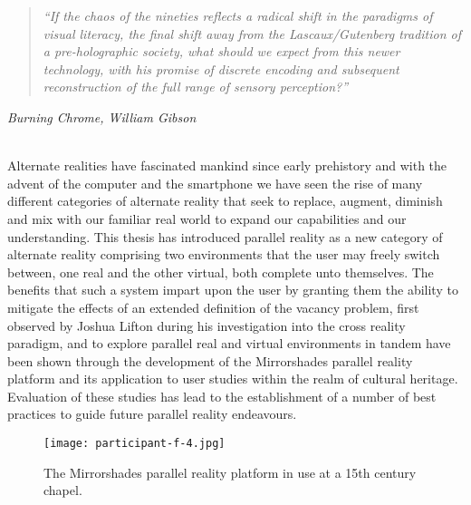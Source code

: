 
\begin{quote}
	\textit{``If the chaos of the nineties reflects a radical shift in the paradigms of visual literacy, the final shift away from the Lascaux/Gutenberg tradition of a pre-holographic society, what should we expect from this newer technology, with his promise of discrete encoding and subsequent reconstruction of the full range of sensory perception?''}
\end{quote}
\hfill \textit{Burning Chrome, William Gibson}
\\
\\


\label{chapter-conclusions}

Alternate realities have fascinated mankind since early prehistory and with the advent of the computer and the smartphone we have seen the rise of many different categories of alternate reality that seek to replace, augment, diminish and mix with our familiar real world to expand our capabilities and our understanding. This thesis has introduced parallel reality as a new category of alternate reality comprising two environments that the user may freely switch between, one real and the other virtual, both complete unto themselves. The benefits that such a system impart upon the user by granting them the ability to mitigate the effects of an extended definition of the vacancy problem, first observed by Joshua Lifton during his investigation into the cross reality paradigm, and to explore parallel real and virtual environments in tandem have been shown through the development of the Mirrorshades parallel reality platform and its application to user studies within the realm of cultural heritage. Evaluation of these studies has lead to the establishment of a number of best practices to guide future parallel reality endeavours.

\begin{figure}[t]
	\begin{center}
		\texttt{[image: participant-f-4.jpg]}
		\caption{The Mirrorshades parallel reality platform in use at a 15th century chapel.}
		\label{participant-f-4.jpg}
	\end{center}	
\end{figure}

